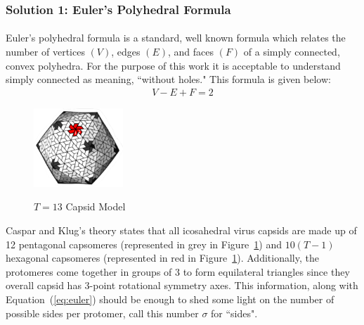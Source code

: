 \documentclass[12pt,letter]{article}
\begin{document}
\subsubsection{Solution 1: Euler's Polyhedral Formula} \label{sec:euler}
\paragraph{}
Euler's polyhedral formula is a standard, well known formula which relates the number of vertices $(V)$, edges $(E)$, and faces $(F)$ of a simply connected, convex polyhedra. For the purpose of this work it is acceptable to understand simply connected as meaning, ``without holes." This formula is given below:
\begin{align}
	V - E + F = 2
	\label{eq:euler}
\end{align}
%
\begin{figure}
	\centering
	\caption{$T = 13$ Capsid Model}
	\includegraphics[width = 0.30\textwidth]{capsid_T13.pdf}
	\label{fig:T13}
	\vspace{-15pt}
\end{figure}

Caspar and Klug's theory states that all icosahedral virus capsids are made up of 12 pentagonal capsomeres (represented in grey in Figure~\ref{fig:T13}) and $10(T-1)$ hexagonal capsomeres (represented in red in Figure~\ref{fig:T13}). Additionally, the protomeres come together in groups of 3 to form equilateral triangles since they overall capsid has 3-point rotational symmetry axes. This information, along with Equation~(\ref{eq:euler}) should be enough to shed some light on the number of possible sides per protomer, call this number $\sigma$ for ``sides".
\end{document}
